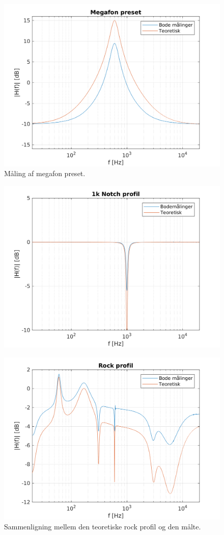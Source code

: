 \begin{figure}[h]
\centering
\includegraphics[]{matlabdemo/test/eq_megafon.png}
\caption{Måling af megafon preset.}
\end{figure}

\begin{figure}[h]
    \centering
    \includegraphics[]{matlabdemo/test/eq_1knotch.png}
\end{figure}

\begin{figure}[h]
\includegraphics[]{matlabdemo/test/eq_rock.png}
\caption{Sammenligning mellem den teoretiske rock profil og den målte.}
\end{figure}

